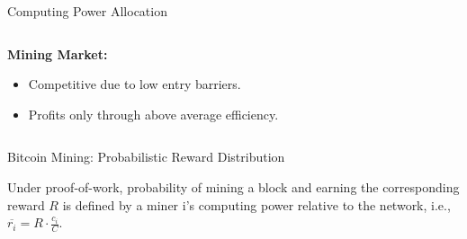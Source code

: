 \documentclass[handout]{beamer}
\begin{document}
\begin{frame}{Computing Power Allocation}

\begin{columns}[T]
	\begin{column}{0.45\textwidth}
		\textbf{Mining Market:} \\
		\begin{itemize}
			\item Competitive due to low entry barriers.
			\item Profits only through above average efficiency.
		\end{itemize}		
		
		
		\vspace{1 em}
		
		\vspace{1 em}
	\end{column} %
	\begin{column}{0.55\textwidth}
		\begin{center}
		\begin{tikzpicture}[scale=1.0, every node/.style ={scale=1.0}]
			
		\end{tikzpicture}
		\end{center}
	\end{column}
\end{columns}

	
\end{frame}

\begin{frame}{Bitcoin Mining: Probabilistic Reward Distribution}

Under proof-of-work, probability of mining a block and earning the corresponding reward $R$ is defined by a miner i's computing power relative to the network, i.e., $\overline{r_{i}} = R  \cdot \frac{c_{i}}{C}$.

\vspace{1.5 em}

\end{frame}
\end{document}
